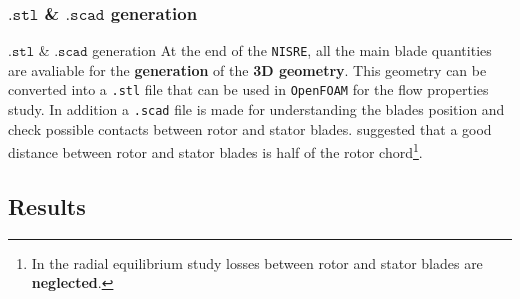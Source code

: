 \subsubsection{$\mathtt{.stl}$ \& $\mathtt{.scad}$ generation}
	\begin{frame}[fragile]{$\mathtt{.stl}$ \& $\mathtt{.scad}$ generation}
		At the end of the \verb|NISRE|, all the main blade quantities are avaliable for the \textbf{generation} of the \textbf{3D geometry}. This geometry can be converted into a \verb|.stl| file that can be used in \verb|OpenFOAM| for the flow properties study. In addition a \verb|.scad| file is made for understanding the blades position and check possible contacts between rotor and stator blades.	
		\newline
		\newline 
		\cite{baskharone2006principles} suggested that a good distance between rotor and stator blades is half of the rotor chord\footnote{In the radial equilibrium study losses between rotor \newline and stator blades are \textbf{neglected}.}.
	\end{frame}
\subsection{Results}
